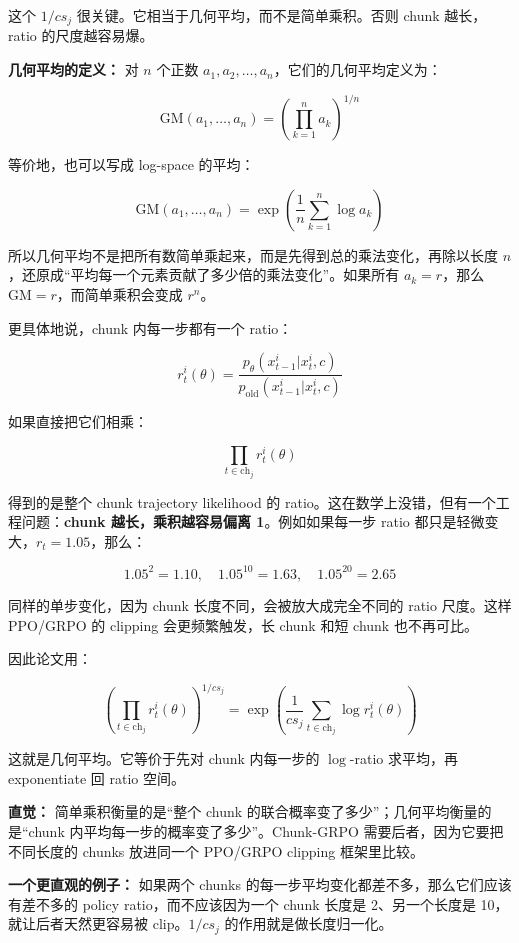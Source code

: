这个 \(1/cs_j\) 很关键。它相当于几何平均，而不是简单乘积。否则 chunk 越长，ratio 的尺度越容易爆。

\textbf{几何平均的定义：} 对 \(n\) 个正数 \(a_1,a_2,\ldots,a_n\)，它们的几何平均定义为：

\[
\mathrm{GM}(a_1,\ldots,a_n)
=
\left(
\prod_{k=1}^{n} a_k
\right)^{1/n}
\]

等价地，也可以写成 log-space 的平均：

\[
\mathrm{GM}(a_1,\ldots,a_n)
=
\exp
\left(
\frac{1}{n}
\sum_{k=1}^{n}\log a_k
\right)
\]

所以几何平均不是把所有数简单乘起来，而是先得到总的乘法变化，再除以长度 \(n\)，还原成“平均每一个元素贡献了多少倍的乘法变化”。如果所有 \(a_k=r\)，那么 \(\mathrm{GM}=r\)，而简单乘积会变成 \(r^n\)。

更具体地说，chunk 内每一步都有一个 ratio：

\[
r_t^i(\theta)
=
\frac{
p_\theta(x_{t-1}^i|x_t^i,c)
}{
p_{\mathrm{old}}(x_{t-1}^i|x_t^i,c)
}
\]

如果直接把它们相乘：

\[
\prod_{t\in \mathrm{ch}_j} r_t^i(\theta)
\]

得到的是整个 chunk trajectory likelihood 的 ratio。这在数学上没错，但有一个工程问题：\textbf{chunk 越长，乘积越容易偏离 1}。例如如果每一步 ratio 都只是轻微变大，\(r_t=1.05\)，那么：

\[
1.05^2=1.10,\quad
1.05^{10}=1.63,\quad
1.05^{20}=2.65
\]

同样的单步变化，因为 chunk 长度不同，会被放大成完全不同的 ratio 尺度。这样 PPO/GRPO 的 clipping 会更频繁触发，长 chunk 和短 chunk 也不再可比。

因此论文用：

\[
\left(
\prod_{t\in \mathrm{ch}_j}r_t^i(\theta)
\right)^{1/cs_j}
=
\exp
\left(
\frac{1}{cs_j}
\sum_{t\in \mathrm{ch}_j}
\log r_t^i(\theta)
\right)
\]

这就是几何平均。它等价于先对 chunk 内每一步的 \(\log\)-ratio 求平均，再 exponentiate 回 ratio 空间。

\begin{summarybox}
\textbf{直觉：} 简单乘积衡量的是“整个 chunk 的联合概率变了多少”；几何平均衡量的是“chunk 内平均每一步的概率变了多少”。Chunk-GRPO 需要后者，因为它要把不同长度的 chunks 放进同一个 PPO/GRPO clipping 框架里比较。
\end{summarybox}

\textbf{一个更直观的例子：} 如果两个 chunks 的每一步平均变化都差不多，那么它们应该有差不多的 policy ratio，而不应该因为一个 chunk 长度是 2、另一个长度是 10，就让后者天然更容易被 clip。\(1/cs_j\) 的作用就是做长度归一化。

